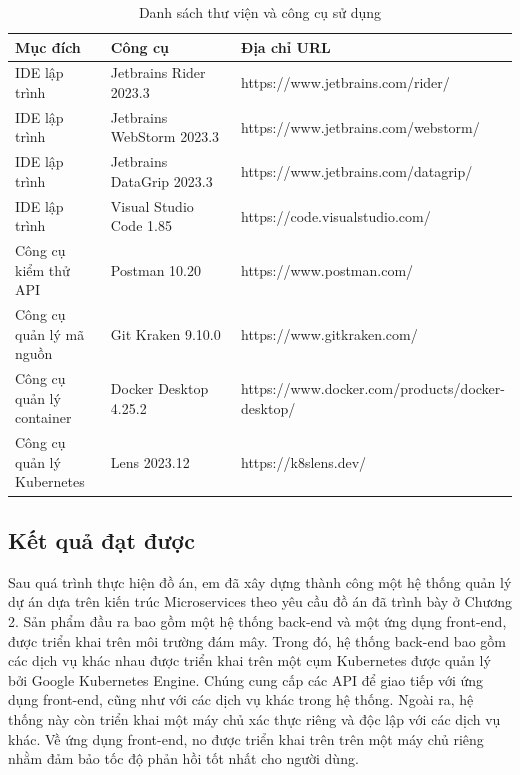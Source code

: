 \documentclass[../DoAn.tex]{subfiles}
\begin{document}
\begin{table}[H]
    \renewcommand{\arraystretch}{1.2}
    \centering{}
    \begin{tabular}{p{0.2\linewidth}p{0.3\linewidth}p{0.5\linewidth}}
        \hline
        \textbf{Mục đích}          & \textbf{Công cụ}          & \textbf{Địa chỉ URL}                            \\ \hline
        IDE lập trình              & Jetbrains Rider 2023.3    & https://www.jetbrains.com/rider/                \\ \hline
        IDE lập trình              & Jetbrains WebStorm 2023.3 & https://www.jetbrains.com/webstorm/             \\ \hline
        IDE lập trình              & Jetbrains DataGrip 2023.3 & https://www.jetbrains.com/datagrip/             \\ \hline
        IDE lập trình              & Visual Studio Code 1.85   & https://code.visualstudio.com/                  \\ \hline
        Công cụ kiểm thử API       & Postman 10.20             & https://www.postman.com/                        \\ \hline
        Công cụ quản lý mã nguồn   & Git Kraken 9.10.0         & https://www.gitkraken.com/                      \\ \hline
        Công cụ quản lý container  & Docker Desktop 4.25.2     & https://www.docker.com/products/docker-desktop/ \\ \hline
        Công cụ quản lý Kubernetes & Lens 2023.12              & https://k8slens.dev/                            \\ \hline
    \end{tabular}
    \renewcommand{\arraystretch}{1}
    \caption{Danh sách thư viện và công cụ sử dụng}
    \label{fig:libaries_and_tools}
\end{table}

\newpage

\subsection{Kết quả đạt được}
\label{subsection:4.3.2}

Sau quá trình thực hiện đồ án, em đã xây dựng thành công một hệ thống quản lý dự án dựa trên kiến trúc Microservices theo yêu cầu đồ án
đã trình bày ở Chương 2. Sản phẩm đầu ra bao gồm một hệ thống back-end và một ứng dụng front-end, được triển khai trên môi trường đám mây.
Trong đó, hệ thống back-end bao gồm các dịch vụ khác nhau được triển khai trên một cụm Kubernetes được quản lý bởi Google Kubernetes Engine.
Chúng cung cấp các API để giao tiếp với ứng dụng front-end, cũng như với các dịch vụ khác trong hệ thống. Ngoài ra, hệ thống này còn triển khai một
máy chủ xác thực riêng và độc lập với các dịch vụ khác.
Về ứng dụng front-end, no được triển khai trên trên một máy chủ riêng nhằm đảm bảo tốc độ phản hồi tốt nhất cho người dùng.
\end{document}
